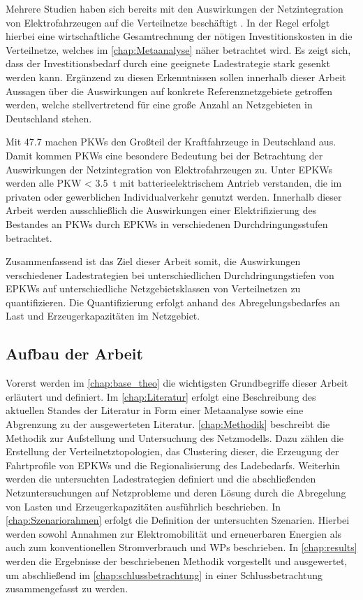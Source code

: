 Mehrere Studien haben sich bereits mit den Auswirkungen der Netzintegration von Elektrofahrzeugen auf die Verteilnetze beschäftigt \cite{Agora2019} \cite{DEAGH2018} \cite{BCG2018}.
In der Regel erfolgt hierbei eine wirtschaftliche Gesamtrechnung der nötigen Investitionskosten in die Verteilnetze, welches im \autoref{chap:Metaanalyse} näher betrachtet wird.
Es zeigt sich, dass der Investitionsbedarf durch eine geeignete Ladestrategie stark gesenkt werden kann.
Ergänzend zu diesen Erkenntnissen sollen innerhalb dieser Arbeit Aussagen über die Auswirkungen auf konkrete Referenznetzgebiete getroffen werden, welche stellvertretend für eine große Anzahl an Netzgebieten in Deutschland stehen.\medskip

Mit \SI{47.7}{\MioStk} \cite{KBA2020a} machen \glspl{PKW} den Großteil der Kraftfahrzeuge in Deutschland aus.
Damit kommen \glspl{PKW} eine besondere Bedeutung bei der Betrachtung der Auswirkungen der Netzintegration von Elektrofahrzeugen zu.
Unter \glspl{EPKW} werden alle \gls{PKW} \SI{< 3.5}{\tonne} mit batterieelektrischem Antrieb verstanden, die im privaten oder gewerblichen Individualverkehr genutzt werden. \cite{BNetzA2020}
Innerhalb dieser Arbeit werden ausschließlich die Auswirkungen einer Elektrifizierung des Bestandes an \glspl{PKW} durch \glspl{EPKW} in verschiedenen Durchdringungsstufen betrachtet.\medskip

Zusammenfassend ist das Ziel dieser Arbeit somit, die Auswirkungen verschiedener Lade\-strategien bei unterschiedlichen Durchdringungstiefen von \glspl{EPKW} auf unterschiedliche Netzgebietsklassen von Verteilnetzen zu quantifizieren.
Die Quantifizierung erfolgt anhand des Abregelungsbedarfes an Last und Erzeugerkapazitäten im Netzgebiet.


\subsection{Aufbau der Arbeit}

Vorerst werden im \autoref{chap:base_theo} die wichtigsten Grundbegriffe dieser Arbeit erläutert und definiert.
Im \autoref{chap:Literatur} erfolgt eine Beschreibung des aktuellen Standes der Literatur in Form einer Metaanalyse sowie eine Abgrenzung zu der ausgewerteten Literatur.
\autoref{chap:Methodik} beschreibt die Methodik zur Aufstellung und Untersuchung des Netzmodells.
Dazu zählen die Erstellung der Verteilnetztopologien, das Clustering dieser, die Erzeugung der Fahrtprofile von \glspl{EPKW} und die Regionalisierung des Ladebedarfs.
Weiterhin werden die untersuchten Ladestrategien definiert und die abschließenden Netzuntersuchungen auf Netzprobleme und deren Lösung durch die Abregelung von Lasten und Erzeugerkapazitäten ausführlich beschrieben.
In \autoref{chap:Szenariorahmen} erfolgt die Definition der untersuchten Szenarien.
Hierbei werden sowohl Annahmen zur Elektromobilität und erneuerbaren Energien als auch zum konventionellen Stromverbrauch und \glspl{WP} beschrieben.
In \autoref{chap:results} werden die Ergebnisse der beschriebenen Methodik vorgestellt und ausgewertet, um abschließend im \autoref{chap:schlussbetrachtung} in einer Schlussbetrachtung zusammengefasst zu werden.

\clearpage
